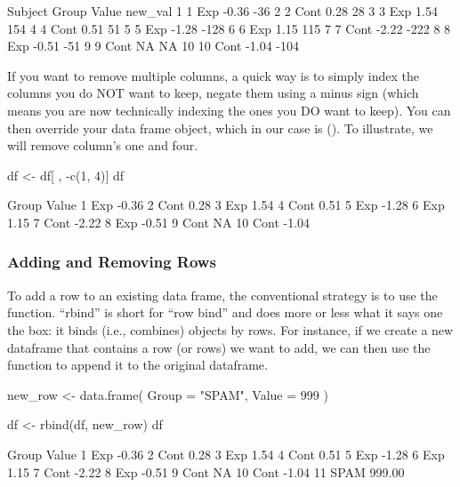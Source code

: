 \begin{outR}
   Subject Group Value new_val
1        1   Exp -0.36     -36
2        2  Cont  0.28      28
3        3   Exp  1.54     154
4        4  Cont  0.51      51
5        5   Exp -1.28    -128
6        6   Exp  1.15     115
7        7  Cont -2.22    -222
8        8   Exp -0.51     -51
9        9  Cont    NA      NA
10      10  Cont -1.04    -104
\end{outR}

If you want to remove multiple columns, a quick way is to simply index the columns you do NOT want to keep, negate them using a minus sign (which means you are now technically indexing the ones you DO want to keep).  You can then override your data frame object, which in our case is (). To illustrate, we will remove column's one and four.

\begin{inR}
df <- df[ , -c(1, 4)]
df
\end{inR}
\begin{outR}
   Group Value
1    Exp -0.36
2   Cont  0.28
3    Exp  1.54
4   Cont  0.51
5    Exp -1.28
6    Exp  1.15
7   Cont -2.22
8    Exp -0.51
9   Cont    NA
10  Cont -1.04
\end{outR}

\subsubsection{Adding and Removing Rows}

To add a row to an existing data frame, the conventional strategy is to use the  function. ``rbind'' is short for ``row bind'' and does more or less what it says one the box: it binds (i.e., combines) objects by rows. For instance, if we create a new dataframe that contains a row (or rows) we want to add, we can then use the  function to append it to the original dataframe.

\begin{inR}
new_row <- data.frame(
  Group = "SPAM",
  Value = 999
)
                      
df <- rbind(df, new_row)
df
\end{inR}
\begin{outR}
   Group  Value
1    Exp  -0.36
2   Cont   0.28
3    Exp   1.54
4   Cont   0.51
5    Exp  -1.28
6    Exp   1.15
7   Cont  -2.22
8    Exp  -0.51
9   Cont     NA
10  Cont  -1.04
11  SPAM 999.00
\end{outR}

